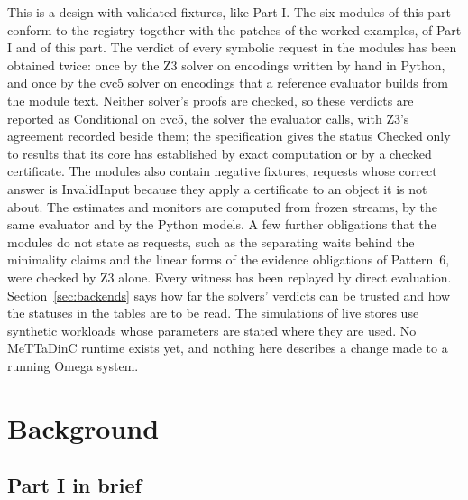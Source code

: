 \documentclass[11pt]{article}
\theoremstyle{definition}
\theoremstyle{plain}
\begin{document}
This is a design with validated fixtures, like Part I. The six modules of this part conform to the
registry together with the patches of the worked examples, of Part I and of this part. The verdict
of every symbolic request in the modules has been obtained twice: once by the Z3 solver on encodings
written by hand in Python, and once by the cvc5 solver on encodings that a reference evaluator
builds from the module text. Neither solver's proofs are checked, so these verdicts are reported as
Conditional on cvc5, the solver the evaluator calls, with Z3's agreement recorded beside them; the
specification gives the status Checked only to results that its core has established by exact
computation or by a checked certificate. The modules also contain negative fixtures, requests whose
correct answer is InvalidInput because they apply a certificate to an object it is not about. The estimates and monitors are computed from frozen streams, by the
same evaluator and by the Python models. A few further obligations that the modules do not state as
requests, such as the separating waits behind the minimality claims and the linear forms of the
evidence obligations of Pattern~6, were checked by Z3 alone. Every witness has been replayed by
direct evaluation. Section~\ref{sec:backends} says how far the solvers' verdicts can be trusted and
how the statuses in the tables are to be read. The simulations of live stores use synthetic
workloads whose parameters are stated where they are used. No MeTTaDinC runtime exists yet, and
nothing here describes a change made to a running Omega system.

\section{Background}\label{sec:background}

\subsection{Part I in brief}\label{sec:part1}
\end{document}
